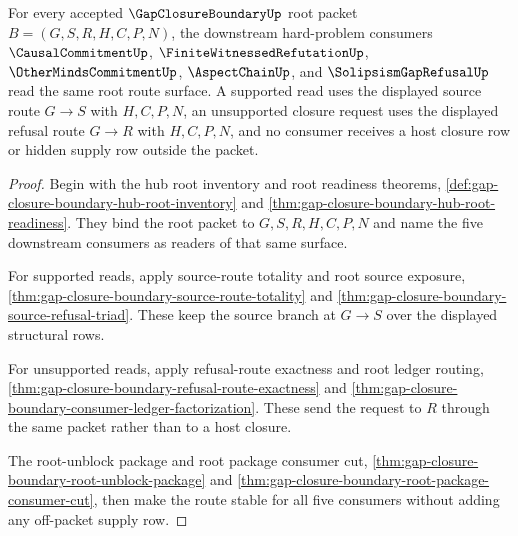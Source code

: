 \begin{theorem}
\label{thm:gap-closure-boundary-hard-problem-root-route-stability}
For every accepted $\GapClosureBoundaryUp$ root packet $B=(G,S,R,H,C,P,N)$, the downstream hard-problem consumers $\CausalCommitmentUp$, $\FiniteWitnessedRefutationUp$, $\OtherMindsCommitmentUp$, $\AspectChainUp$, and $\SolipsismGapRefusalUp$ read the same root route surface. A supported read uses the displayed source route $G \longrightarrow S$ with $H,C,P,N$, an unsupported closure request uses the displayed refusal route $G \longrightarrow R$ with $H,C,P,N$, and no consumer receives a host closure row or hidden supply row outside the packet.
\end{theorem}
\begin{proof}
Begin with the hub root inventory and root readiness theorems, \autoref{def:gap-closure-boundary-hub-root-inventory} and \autoref{thm:gap-closure-boundary-hub-root-readiness}. They bind the root packet to $G,S,R,H,C,P,N$ and name the five downstream consumers as readers of that same surface.

For supported reads, apply source-route totality and root source exposure, \autoref{thm:gap-closure-boundary-source-route-totality} and \autoref{thm:gap-closure-boundary-source-refusal-triad}. These keep the source branch at $G \longrightarrow S$ over the displayed structural rows.

For unsupported reads, apply refusal-route exactness and root ledger routing, \autoref{thm:gap-closure-boundary-refusal-route-exactness} and \autoref{thm:gap-closure-boundary-consumer-ledger-factorization}. These send the request to $R$ through the same packet rather than to a host closure.

The root-unblock package and root package consumer cut, \autoref{thm:gap-closure-boundary-root-unblock-package} and \autoref{thm:gap-closure-boundary-root-package-consumer-cut}, then make the route stable for all five consumers without adding any off-packet supply row.
\end{proof}

